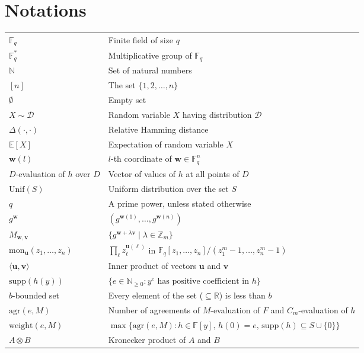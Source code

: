 \chapter*{Notations}

\begin{longtable}{@{} l p{9cm} @{}}
$\mathbb{F}_q$ & Finite field of size $q$ \\[0.4em]
$\mathbb{F}_q^*$ & Multiplicative group of $\mathbb{F}_q$ \\[0.4em]
$\mathbb{N}$ & Set of natural numbers \\[0.4em]
$[n]$ & The set $\{1,2,\dots,n\}$ \\[0.4em]
$\emptyset$ & Empty set \\[0.4em]
$X \sim \mathscr{D}$ & Random variable $X$ having distribution $\mathscr{D}$ \\[0.4em]
$\Delta(\cdot,\cdot)$ & Relative Hamming distance \\[0.4em]
$\mathbb{E}[X]$ & Expectation of random variable $X$ \\[0.4em]
$\mathbf{w}(l)$ & $l$-th coordinate of $\mathbf{w}\in\mathbb{F}_q^n$ \\[0.4em]
$D$-evaluation of $h$ over $D$ & Vector of values of $h$ at all points of $D$ \\[0.4em]
$\mathrm{Unif}(S)$ & Uniform distribution over the set $S$ \\[0.4em]
$q$ & A prime power, unless stated otherwise \\[0.4em]
$g^{\mathbf{w}}$ & $(g^{\mathbf{w}(1)}, \ldots, g^{\mathbf{w}(n)})$ \\[0.4em]
$M_{\mathbf{w},\mathbf{v}}$ & $\{g^{\mathbf{w}+\lambda\mathbf{v}} \mid \lambda \in \mathbb{Z}_m\}$ \\[0.4em]
$\mathrm{mon}_{\mathbf{u}}(z_1,\ldots,z_n)$ & $\prod_{\ell} z_\ell^{\mathbf{u}(\ell)}$ in $\mathbb{F}_q[z_1,\dots,z_n]/(z_1^m-1,\dots,z_n^m-1)$ \\[0.4em]
$\langle\mathbf{u},\mathbf{v}\rangle$ & Inner product of vectors $\mathbf{u}$ and $\mathbf{v}$ \\[0.4em]
$\mathrm{supp}(h(y))$ & $\{e\in\mathbb{N}_{\geq0} : y^e\text{ has positive coefficient in }h\}$ \\[0.4em]
$b$-bounded set & Every element of the set ($\subseteq\mathbb{R}$) is less than $b$ \\[0.4em]
$\mathrm{agr}(e,M)$ & Number of agreements of $M$-evaluation of $F$ and $C_m$-evaluation of $h$ \\[0.4em]
$\mathrm{weight}(e,M)$ & $\max\{\mathrm{agr}(e,M) : h\in\mathbb{F}[y],\, h(0)=e,\, \mathrm{supp}(h)\subseteq S\cup\{0\}\}$ \\[0.4em]
$A \otimes B$ & Kronecker product of $A$ and $B$ \\
\end{longtable}